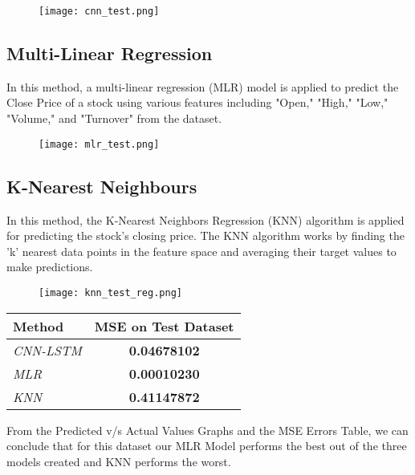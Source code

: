 \documentclass{article}
\begin{document}
\begin{figure}[H]
    \centering
    \texttt{[image: cnn\_test.png]}
    \label{fig:enter-label}
\end{figure}

\subsection{Multi-Linear Regression}

In this method, a multi-linear regression (MLR) model is applied to predict the Close Price of a stock using various features including "Open," "High," "Low," "Volume," and "Turnover" from the dataset.

\begin{figure}[H]
    \centering
    \texttt{[image: mlr\_test.png]}
    \label{fig:enter-label}
\end{figure}

\subsection{K-Nearest Neighbours}
In this method, the K-Nearest Neighbors Regression (KNN) algorithm is applied for predicting the stock's closing price. The KNN algorithm works by finding the 'k' nearest data points in the feature space and averaging their target values to make predictions.

\begin{figure}[H]
    \centering
    \texttt{[image: knn\_test\_reg.png]}
    \label{fig:enter-label}
\end{figure}

\begin{table}[h]
    \centering
    \begin{tabular}{l c} 
        \toprule
        \textbf{Method} & \textbf{MSE on Test Dataset} \\
        \midrule
        \emph{CNN-LSTM} & \textbf{0.04678102} \\
        \emph{MLR} & \textbf{0.00010230} \\
        \emph{KNN} & \textbf{0.41147872} \\
        \bottomrule
    \end{tabular}
    \label{tab:mean_squared_error}
\end{table}

From the Predicted v/s Actual Values Graphs and the MSE Errors Table, we can conclude that for this dataset our MLR Model performs the best out of the three models created and KNN performs the worst.
\end{document}

